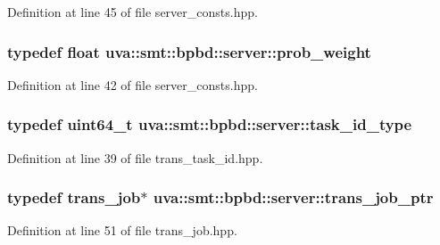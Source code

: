 Definition at line 45 of file server\+\_\+consts.\+hpp.

\hypertarget{namespaceuva_1_1smt_1_1bpbd_1_1server_a01e9ea4de9c226f4464862e84ff0bbcc}{}
\subsubsection[{prob\+\_\+weight}]{\setlength{\rightskip}{0pt plus 5cm}typedef float {\bf uva\+::smt\+::bpbd\+::server\+::prob\+\_\+weight}}\label{namespaceuva_1_1smt_1_1bpbd_1_1server_a01e9ea4de9c226f4464862e84ff0bbcc}


Definition at line 42 of file server\+\_\+consts.\+hpp.

\hypertarget{namespaceuva_1_1smt_1_1bpbd_1_1server_a67f8b384118030b4ae63f1239253f9ed}{}
\subsubsection[{task\+\_\+id\+\_\+type}]{\setlength{\rightskip}{0pt plus 5cm}typedef uint64\+\_\+t {\bf uva\+::smt\+::bpbd\+::server\+::task\+\_\+id\+\_\+type}}\label{namespaceuva_1_1smt_1_1bpbd_1_1server_a67f8b384118030b4ae63f1239253f9ed}


Definition at line 39 of file trans\+\_\+task\+\_\+id.\+hpp.

\hypertarget{namespaceuva_1_1smt_1_1bpbd_1_1server_acb76132c82e66b5dbf7e3aa0e5af2580}{}
\subsubsection[{trans\+\_\+job\+\_\+ptr}]{\setlength{\rightskip}{0pt plus 5cm}typedef {\bf trans\+\_\+job}$\ast$ {\bf uva\+::smt\+::bpbd\+::server\+::trans\+\_\+job\+\_\+ptr}}\label{namespaceuva_1_1smt_1_1bpbd_1_1server_acb76132c82e66b5dbf7e3aa0e5af2580}


Definition at line 51 of file trans\+\_\+job.\+hpp.

